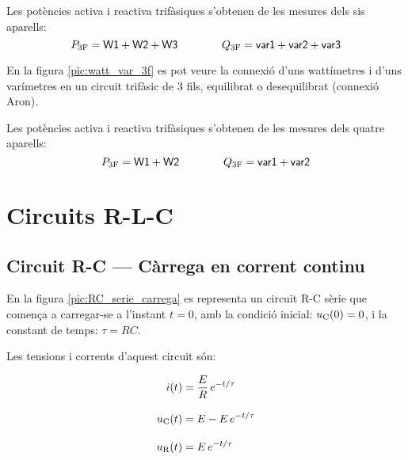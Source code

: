 Les potències activa i reactiva trifàsiques s'obtenen de les mesures
dels sis aparells:
\begin{equation}
    P_\mathrm{3F} = \textsf{W1} +  \textsf{W2} + \textsf{W3}
    \qquad\qquad Q_\mathrm{3F} = \textsf{var1} +  \textsf{var2} + \textsf{var3}
\end{equation}

En la figura \vref{pic:watt_var_3f} es pot veure la connexió d'uns
wattímetres i d'uns varímetres en un circuit trifàsic de 3 fils,
equilibrat o desequilibrat (connexió Aron).

\begin{center}
\centering
    
    \label{pic:watt_var_3f}
\end{center}

Les potències activa i reactiva trifàsiques s'obtenen de les mesures
dels quatre aparells:
\begin{equation}
    P_\mathrm{3F} = \textsf{W1} +  \textsf{W2}
    \qquad\qquad Q_\mathrm{3F} = \textsf{var1} +  \textsf{var2}
\end{equation}



\section{Circuits R-L-C}


\subsection{Circuit R-C --- Càrrega en corrent continu}\label{sec:RC-carrega}

En la figura \vref{pic:RC_serie_carrega} es representa un circuit R-C sèrie que comença a carregar-se a l'instant $t=0$, amb la condició inicial: $u_\mathrm{C}(0) = 0$, i la constant de temps: $\tau = R C$.
\begin{center}
    
    \label{pic:RC_serie_carrega}
\end{center}

Les tensions i corrents d'aquest circuit són:

\hfill
\begin{minipage}[b]{9cm}
    
\end{minipage}
\hfill
\begin{minipage}[b]{6cm}
    \begin{align}
        i(t) &= \frac{E}{R}\,e^{-t/\tau}\label{eq:RC-carrega} \\[3mm]
        u_\mathrm{C}(t) &= E  - E\, e^{-t/\tau}  \\[3mm]
        u_\mathrm{R}(t) &= E\,e^{-t/\tau}
    \end{align}
\end{minipage}

